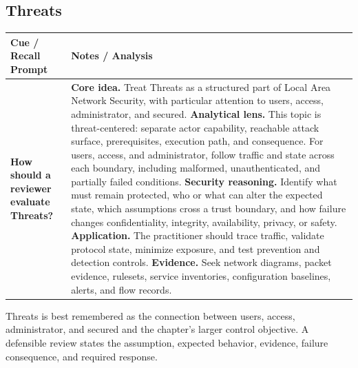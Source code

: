 \documentclass[11pt]{article}
\newcommand{\CornellHeader}{%
\rowcolor{Navy}\color{white}\bfseries Cue / Recall Prompt & \color{white}\bfseries Notes / Analysis\\\hline}
\newcommand{\CornellRow}[2]{%
\cellcolor{CueGray}\RaggedRight\textbf{#1} & \RaggedRight #2\\\hline}
\begin{document}
\subsection*{Threats}
\begin{longtable}{>{\RaggedRight\arraybackslash}p{}|>{\RaggedRight\arraybackslash}p{}}
\CornellHeader
\CornellRow{How should a reviewer evaluate Threats?}{\textbf{Core idea.} Treat Threats as a structured part of Local Area Network Security, with particular attention to users, access, administrator, and secured. \textbf{Analytical lens.} This topic is threat-centered: separate actor capability, reachable attack surface, prerequisites, execution path, and consequence. For users, access, and administrator, follow traffic and state across each boundary, including malformed, unauthenticated, and partially failed conditions. \textbf{Security reasoning.} Identify what must remain protected, who or what can alter the expected state, which assumptions cross a trust boundary, and how failure changes confidentiality, integrity, availability, privacy, or safety. \textbf{Application.} The practitioner should trace traffic, validate protocol state, minimize exposure, and test prevention and detection controls. \textbf{Evidence.} Seek network diagrams, packet evidence, rulesets, service inventories, configuration baselines, alerts, and flow records.}
\end{longtable}
\begin{topicsummary}
Threats is best remembered as the connection between users, access, administrator, and secured and the chapter's larger control objective. A defensible review states the assumption, expected behavior, evidence, failure consequence, and required response.
\end{topicsummary}
\end{document}
